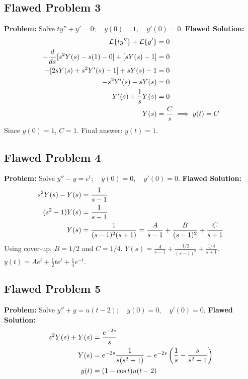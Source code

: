 \documentclass[11pt, letterpaper]{article}
\theoremstyle{definition}
\theoremstyle{remark}
\newcommand{\Lap}{\mathcal{L}}
\begin{document}
\subsection*{Flawed Problem 3}
\textbf{Problem:} Solve $ty'' + y' = 0 ; \quad y(0) = 1 , \quad y'(0) = 0$.
\textbf{Flawed Solution:}
\begin{align*}
\Lap\{ty''\} + \Lap\{y'\} &= 0 \\ \relax
-\frac{d}{ds}[s^2 Y(s) - s(1) - 0] + [sY(s) - 1] &= 0 \\ \relax
-[2sY(s) + s^2 Y'(s) - 1] + sY(s) - 1 &= 0 \\ \relax
-s^2 Y'(s) - sY(s) &= 0 \\ \relax
Y'(s) + \frac{1}{s}Y(s) &= 0 \\ \relax
Y(s) &= \frac{C}{s} \implies y(t) = C
\end{align*}
Since $y(0) = 1$, $C = 1$. Final answer: $y(t) = 1$.

\subsection*{Flawed Problem 4}
\textbf{Problem:} Solve $y'' - y = e^t ; \quad y(0) = 0 , \quad y'(0) = 0$.
\textbf{Flawed Solution:}
\begin{align*}
s^2 Y(s) - Y(s) &= \frac{1}{s - 1} \\ \relax
(s^2 - 1)Y(s) &= \frac{1}{s - 1} \\ \relax
Y(s) &= \frac{1}{(s - 1)^2(s + 1)} = \frac{A}{s - 1} + \frac{B}{(s - 1)^2} + \frac{C}{s + 1}
\end{align*}
Using cover-up, $B = 1/2$ and $C = 1/4$.
$Y(s) = \frac{A}{s - 1} + \frac{1/2}{(s - 1)^2} + \frac{1/4}{s + 1}$.
$y(t) = Ae^t + \frac{1}{2}te^t + \frac{1}{4}e^{-t}$.

\subsection*{Flawed Problem 5}
\textbf{Problem:} Solve $y'' + y = u(t - 2) ; \quad y(0) = 0 , \quad y'(0) = 0$.
\textbf{Flawed Solution:}
\begin{align*}
s^2 Y(s) + Y(s) &= \frac{e^{-2s}}{s} \\ \relax
Y(s) &= e^{-2s} \frac{1}{s(s^2 + 1)} = e^{-2s} \left( \frac{1}{s} - \frac{s}{s^2 + 1} \right) \\ \relax
y(t) &= (1 - \cos t) u(t - 2)
\end{align*}
\end{document}

